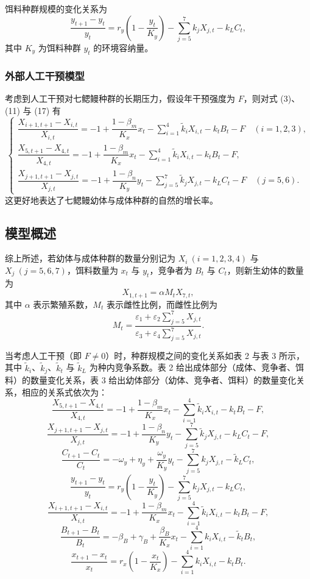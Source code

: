 \documentclass[11pt,a4paper]{ctexart}
\begin{document}
饵料种群规模的变化关系为
\begin{equation}
\frac{y_{t+1}-y_t}{y_t}=r_y\left(1-\frac{y_t}{K_y}\right)-\sum_{j=5}^{7}k_jX_{j,t}-k_LC_t,
\end{equation}
其中 $K_y$ 为饵料种群 $y_t$ 的环境容纳量。

\subsubsection{外部人工干预模型}

考虑到人工干预对七鳃鳗种群的长期压力，假设年干预强度为 $F$，则对式 (3)、(11) 与 (17) 有
\begin{equation}
\left\{
\begin{array}{l}
\dfrac{X_{i+1,t+1}-X_{i,t}}{X_{i,t}}=-1+\dfrac{1-\beta_m}{K_x}x_t-\sum\limits_{i=1}^{4}\tilde{k}_iX_{i,t}-k_tB_t-F\quad(i=1,2,3),\\[10pt]
\dfrac{X_{5,t+1}-X_{4,t}}{X_{4,t}}=-1+\dfrac{1-\beta_m}{K_x}x_t-\sum\limits_{i=1}^{4}\tilde{k}_iX_{i,t}-k_tB_t-F,\\[10pt]
\dfrac{X_{j+1,t+1}-X_{j,t}}{X_{j,t}}=-1+\dfrac{1-\beta_n}{K_y}y_t-\sum\limits_{j=5}^{7}\tilde{k}_jX_{j,t}-k_LC_t-F\quad(j=5,6).
\end{array}
\right.
\end{equation}
这更好地表达了七鳃鳗幼体与成体种群的自然的增长率。

\subsection{模型概述}

综上所述，若幼体与成体种群的数量分别记为 $X_i\ (i=1,2,3,4)$ 与 $X_j\ (j=5,6,7)$，饵料数量为 $x_t$ 与 $y_t$，竞争者为 $B_t$ 与 $C_t$，则新生幼体的数量为
\[
X_{1,t+1}=\alpha M_tX_{7,t},
\]
其中 $\alpha$ 表示繁殖系数，$M_t$ 表示雌性比例，而雌性比例为
\[
M_t=\frac{\varepsilon_1+\varepsilon_2\sum\limits_{j=5}^{7}X_{j,t}}{\varepsilon_3+\varepsilon_4\sum\limits_{j=5}^{7}X_{j,t}}.
\]

当考虑人工干预（即 $F\neq 0$）时，种群规模之间的变化关系如表 2 与表 3 所示，其中 $\tilde{k}_i$、$\tilde{k}_j$、$\tilde{k}_t$ 与 $\tilde{k}_L$ 为种内竞争系数。表 2 给出成体部分（成体、竞争者、饵料）的数量变化关系，表 3 给出幼体部分（幼体、竞争者、饵料）的数量变化关系，相应的关系式依次为：
\[
\frac{X_{5,t+1}-X_{4,t}}{X_{4,t}}=-1+\frac{1-\beta_m}{K_x}x_t-\sum_{i=1}^{4}\tilde{k}_iX_{i,t}-k_tB_t-F,
\]
\[
\frac{X_{j+1,t+1}-X_{j,t}}{X_{j,t}}=-1+\frac{1-\beta_n}{K_y}y_t-\sum_{j=5}^{7}\tilde{k}_jX_{j,t}-k_LC_t-F,
\]
\[
\frac{C_{t+1}-C_t}{C_t}=-\omega_y+\eta_y+\frac{\omega_y}{K_y}y_t-\sum_{j=5}^{7}k_jX_{j,t}-\tilde{k}_LC_t,
\]
\[
\frac{y_{t+1}-y_t}{y_t}=r_y\left(1-\frac{y_t}{K_y}\right)-\sum_{j=5}^{7}k_jX_{j,t}-k_LC_t,
\]
\[
\frac{X_{i+1,t+1}-X_{i,t}}{X_{i,t}}=-1+\frac{1-\beta_m}{K_x}x_t-\sum_{i=1}^{4}\tilde{k}_iX_{i,t}-k_tB_t-F,
\]
\[
\frac{B_{t+1}-B_t}{B_t}=-\beta_B+\gamma_B+\frac{\beta_B}{K_x}x_t-\sum_{i=1}^{4}k_iX_{i,t}-\tilde{k}_tB_t,
\]
\[
\frac{x_{t+1}-x_t}{x_t}=r_x\left(1-\frac{x_t}{K_x}\right)-\sum_{i=1}^{4}k_iX_{i,t}-k_tB_t.
\]
\end{document}
